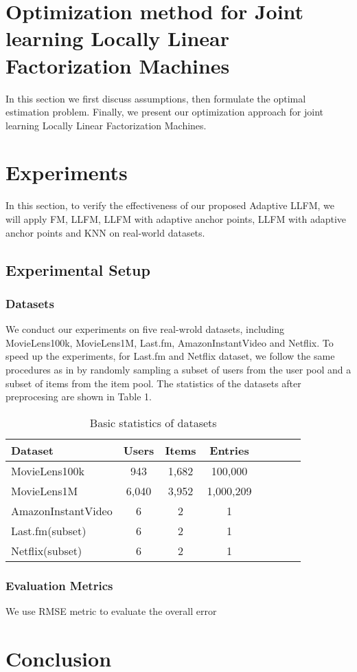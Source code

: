 \documentclass{article}
\begin{document}
\section{Optimization method for Joint learning Locally Linear Factorization Machines}
In this section we first discuss assumptions, then formulate the optimal estimation problem. Finally, we present our optimization approach for joint learning Locally Linear Factorization Machines.

\section{Experiments}
In this section, to verify the effectiveness of our proposed Adaptive LLFM, we will apply FM, LLFM, LLFM with adaptive anchor points, LLFM with adaptive anchor points and KNN on real-world datasets.
\subsection{Experimental Setup}
\subsubsection{Datasets}
We conduct our experiments on five real-wrold datasets, including MovieLens100k, MovieLens1M, Last.fm, AmazonInstantVideo and Netflix. To speed up the experiments, for Last.fm and Netflix dataset, we follow the same procedures as in \cite{pan2013gbpr} by randomly sampling a subset of users from the user pool and a subset of items from the item pool. The statistics of the datasets after preprocesing are shown in Table 1.
\begin{table}
	\caption{Basic statistics of datasets}
	\begin{tabular}{l*{6}{c}r}
		Dataset              & Users & Items & Entries \\
		\hline
		MovieLens100k 		   	& 943 & 1,682 & 100,000  \\
		MovieLens1M            	& 6,040 & 3,952 & 1,000,209  \\
		AmazonInstantVideo     	& 6 & 2 & 1   \\
		Last.fm(subset)        	& 6 & 2 & 1   \\
		Netflix(subset)     	& 6 & 2 & 1   \\
	\end{tabular}
\end{table}
\subsubsection{Evaluation Metrics}
We use RMSE metric to evaluate the overall error 
\section{Conclusion}


\end{document}
